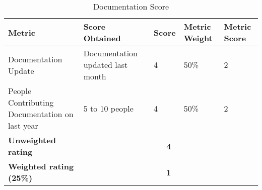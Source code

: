 \documentclass[11pt]{article}
\begin{document}
\begin{table}[H]
  \begin{center}
    \begin{tabular}{ | p{4cm} | p{3cm} | l | p{1.2cm} | p{1.2cm} | }
    \toprule
    \textbf{Metric} & \textbf{Score Obtained} & \textbf{Score} & \textbf{Metric Weight} & \textbf{Metric Score}\\
    \hline
    Documentation Update & Documentation updated last month & 4 & 50\% & 2\\
    \hline
    People Contributing Documentation on last year & 5 to 10 people & 4 & 50\% & 2\\
    \midrule
    \textbf{Unweighted rating} & \multicolumn{4}{c|}{\textbf{4}}\\
    \hline
    \textbf{Weighted rating (25\%)} & \multicolumn {4}{c|}{\textbf{1}}\\
    \bottomrule
    \end{tabular}
    \caption{Documentation Score}
    \label{tab:docu_score}
  \end{center}
\end{table}
\end{document}
